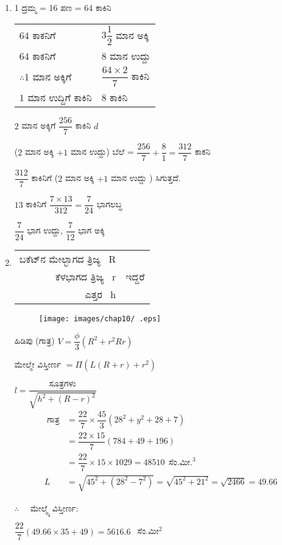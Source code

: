 \begin{enumerate}
\item 1 ದ್ರಮ್ಮ = 16 ಪಣ =  64 ಕಾಕಿನಿ 

\begin{tabular}[t]{ll}
$64$ ಕಾಕನಿಗೆ & $3\dfrac{1}{2}$ ಮಾನ ಅಕ್ಕಿ \\
$64$ ಕಾಕನಿಗೆ & $8$ ಮಾನ ಉದ್ದು \\[0.3cm]
$\therefore 1$ ಮಾನ ಅಕ್ಕಿಗೆ & $\dfrac{64\times 2}{7}$ ಕಾಕಿನಿ\\
$1$ ಮಾನ ಉದ್ದಿಗೆ ಕಾಕಿನಿ  & $8$ ಕಾಕಿನಿ 
\end{tabular}

$2$ ಮಾನ ಅಕ್ಕಿಗೆ $\dfrac{256}{7}$ ಕಾಕಿನಿ $d$

($2$ ಮಾನ ಅಕ್ಕಿ $+ 1$ ಮಾನ ಉದ್ದು) ಬೆಲೆ = $\dfrac{256}{7} + \dfrac{8}{1} = \dfrac{312}{7}$ ಕಾಕನಿ 

$\dfrac{312}{7}$ ಕಾಕಿನಿಗೆ ($2$ ಮಾನ ಅಕ್ಕಿ $+ 1$ ಮಾನ ಉದ್ದು ) ಸಿಗುತ್ತದೆ. 

$13$ ಕಾಕಿನಿಗೆ  $\dfrac{7\times 13}{312} = \dfrac{7}{24}$ ಭಾಗಲಬ್ಧ 

$\dfrac{7}{24}$ ಭಾಗ ಉದ್ದು, $\dfrac{7}{12}$ ಭಾಗ ಅಕ್ಕಿ 

\item 
\begin{tabular}[t]{rl}
ಬಕೆಟ್‌ನ ಮೇಲ್ಭಾಗದ ತ್ರಿಜ್ಯ  ~R & \\
ಕೆಳಭಾಗದ ತ್ರಿಜ್ಯ ~r & ಇದ್ದರೆ \\
ಎತ್ತರ ~h & 
\end{tabular}

\begin{figure}[!h]
\centering
\texttt{[image: images/chap10/ .eps]}
\end{figure}

ಹಿಡಿಪು (ಗಾತ್ರ) $V = \dfrac{\phi}{3} (R^{2} + r^{2}  Rr)$

ಮೇಲ್ಮೇ ವಿಸ್ತೀರ್ಣ $= \Pi (L(R + r) + r^{2})$

${l = \dfrac{{\text{ ಸೂತ್ರಗಳು }}}{\sqrt{h^{2} + (R - r)^{2}}}}$
\begin{align*}
\text{ ಗಾತ್ರ} & = \dfrac{22}{7} \times \dfrac{45}{3} (28^{2} + y^{2} + 28 + 7)\\
& = \dfrac{22\times 15}{7} (784 + 49 + 196)\\
& = \dfrac{22}{7} \times 15\times 1029 = 48510 ~~\text{ಸೆಂ.ಮೀ.}^{3}\\
L & = \sqrt{45^{2} + (28^{2} - 7^{2})} = \sqrt{45^{2} + 21^{2}} = \sqrt{2466} = 49.66
\end{align*}

$\therefore\quad$ ಮೇಲ್ಮ್ಯೆ  ವಿಸ್ತೀರ್ಣ: 

$\dfrac{22}{7} (49.66\times 35 + 49) = 5616.6~~$ ಸೆಂ.ಮೀ$^{2}$


\end{enumerate}
